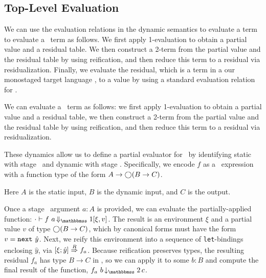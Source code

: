 

\subsection {Top-Level Evaluation}


We can use the evaluation relations in the dynamic semantics to
evaluate a term to evaluate a \lang\ term as follows. We first apply
1-evaluation to obtain a partial value and a residual table. We then
construct a 2-term from the partial value and the residual table by
using reification, and then reduce this term to a residual via
residualization.  Finally, we evaluate the residual, which is a term in a
our monostaged target language \langmono, to a value by using  a
standard evaluation relation for \langmono.

We can evaluate a \lang\ term as
follows: we first apply 1-evaluation to obtain a partial value and a
residual table, we then construct a 2-term from the partial value and
the residual table by using reification, and then reduce this term to
a residual via residualization.

These dynamics allow us to define a partial evaluator for \lang\ by identifying
static with stage \bbone\ and dynamic with stage \bbtwo.  Specifically, we
encode $f$ as a \lang\ expression with a function type of the form
$A\to\bigcirc(B\to C)$.%

Here $A$ is the static input, $B$ is the dynamic input, and $C$ is the output.

Once a stage \bbone\ argument $a:A$ is provided, we can evaluate the partially-applied
function:
$\cdot\vdash f~a \mathop{\redonesym} [\xi,v]$.
The result is an environment $\xi$ and a partial value $v$ of type $\bigcirc(B\to
C)$, which by canonical forms must have the form $v = {\tt next}~\hat y$. 
Next, we reify this environment into a sequence of \verb|let|-bindings
enclosing $\hat y$, via $[{\xi};{\hat y}]\overset{R}\Rightarrow{f_a}$. 
Because reification preserves types, the resulting residual $f_a$ has type $B\to C$ in \langTwo, so we can apply it to some $b:B$
and compute the final result of the function, $f_a~b \mathop{\tworedsym} c$.

